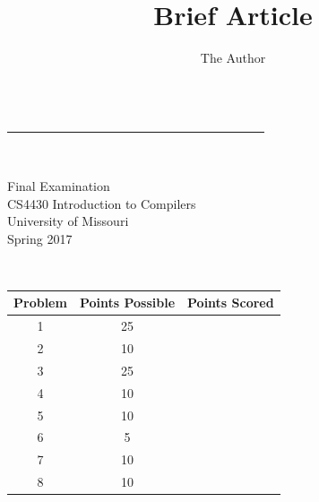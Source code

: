 \documentclass[11pt]{article} %
\title{Brief Article}
\author{The Author}
\begin{document}

\underline{~~~~~~~~~~~~~~~~~~~~~~~~~~~~~~~~~~~~~~~~~}


\vspace{8ex}

\begin{center}
~~~
{\Large{\bf
\begin{minipage}{4in}
Final Examination
\\
CS4430 Introduction to Compilers
\\
University of Missouri
\\
Spring 2017
\end{minipage}
}}
\end{center}

\vspace{8ex}~~
~~~~~~~~~~~~~~~~~~~~~~~~~~~~~~~~{\Large
\begin{tabular}{|c|c|r|}
\hline
Problem & Points Possible & Points Scored
\\
\hline
1 & 25 & 
\\
\hline
2 & 10 &
\\
\hline
3 & 25 & 
\\
\hline
4 & 10 &
\\
\hline
5 & 10 &
\\
\hline
6 & 5 & 
\\
\hline
7 & 10 &
\\
\hline
8 & 10 &
\\
\hline
\end{tabular}
}

\vfill
\newpage
\end{document}
